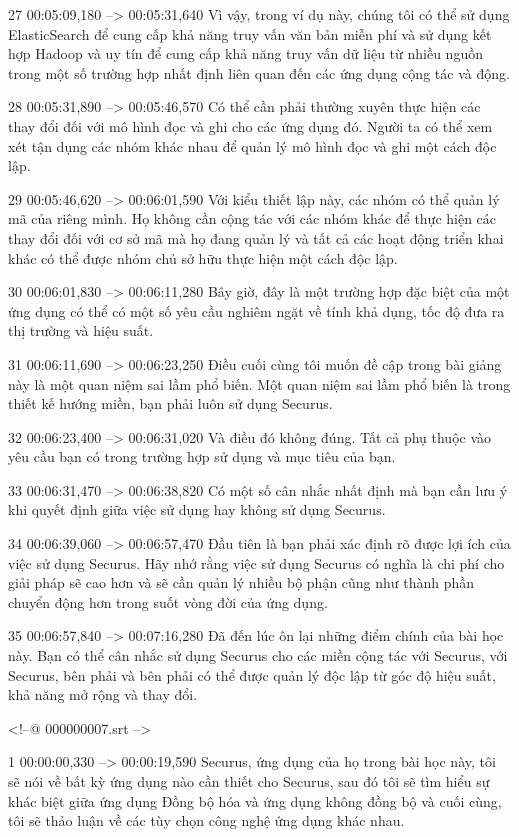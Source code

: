 27
00:05:09,180 --> 00:05:31,640
Vì vậy, trong ví dụ này, chúng tôi có thể sử dụng ElasticSearch để cung cấp khả năng truy vấn văn bản miễn phí và sử dụng kết hợp Hadoop và uy tín để cung cấp khả năng truy vấn dữ liệu từ nhiều nguồn trong một số trường hợp nhất định liên quan đến các ứng dụng cộng tác và động.

28
00:05:31,890 --> 00:05:46,570
Có thể cần phải thường xuyên thực hiện các thay đổi đối với mô hình đọc và ghi cho các ứng dụng đó.  Người ta có thể xem xét tận dụng các nhóm khác nhau để quản lý mô hình đọc và ghi một cách độc lập.

29
00:05:46,620 --> 00:06:01,590
Với kiểu thiết lập này, các nhóm có thể quản lý mã của riêng mình.  Họ không cần cộng tác với các nhóm khác để thực hiện các thay đổi đối với cơ sở mã mà họ đang quản lý và tất cả các hoạt động triển khai khác có thể được nhóm chủ sở hữu thực hiện một cách độc lập.

30
00:06:01,830 --> 00:06:11,280
Bây giờ, đây là một trường hợp đặc biệt của một ứng dụng có thể có một số yêu cầu nghiêm ngặt về tính khả dụng, tốc độ đưa ra thị trường và hiệu suất.

31
00:06:11,690 --> 00:06:23,250
Điều cuối cùng tôi muốn đề cập trong bài giảng này là một quan niệm sai lầm phổ biến.  Một quan niệm sai lầm phổ biến là trong thiết kế hướng miền, bạn phải luôn sử dụng Securus.

32
00:06:23,400 --> 00:06:31,020
Và điều đó không đúng.  Tất cả phụ thuộc vào yêu cầu bạn có trong trường hợp sử dụng và mục tiêu của bạn.

33
00:06:31,470 --> 00:06:38,820
Có một số cân nhắc nhất định mà bạn cần lưu ý khi quyết định giữa việc sử dụng hay không sử dụng Securus.

34
00:06:39,060 --> 00:06:57,470
Đầu tiên là bạn phải xác định rõ được lợi ích của việc sử dụng Securus.  Hãy nhớ rằng việc sử dụng Securus có nghĩa là chi phí cho giải pháp sẽ cao hơn và sẽ cần quản lý nhiều bộ phận cũng như thành phần chuyển động hơn trong suốt vòng đời của ứng dụng.

35
00:06:57,840 --> 00:07:16,280
Đã đến lúc ôn lại những điểm chính của bài học này.  Bạn có thể cân nhắc sử dụng Securus cho các miền cộng tác với Securus, với Securus, bên phải và bên phải có thể được quản lý độc lập từ góc độ hiệu suất, khả năng mở rộng và thay đổi.

<!--@ 000000007.srt -->

1
00:00:00,330 --> 00:00:19,590
Securus, ứng dụng của họ trong bài học này, tôi sẽ nói về bất kỳ ứng dụng nào cần thiết cho Securus, sau đó tôi sẽ tìm hiểu sự khác biệt giữa ứng dụng Đồng bộ hóa và ứng dụng không đồng bộ và cuối cùng, tôi sẽ thảo luận về các tùy chọn công nghệ ứng dụng khác nhau.

